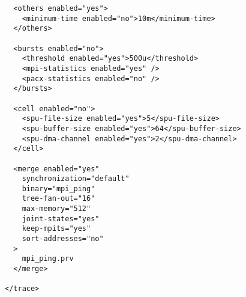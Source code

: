 \begin{verbatim}
  <others enabled="yes">
    <minimum-time enabled="no">10m</minimum-time>
  </others>

  <bursts enabled="no">
    <threshold enabled="yes">500u</threshold>
    <mpi-statistics enabled="yes" />
    <pacx-statistics enabled="no" />
  </bursts>

  <cell enabled="no">
    <spu-file-size enabled="yes">5</spu-file-size>
    <spu-buffer-size enabled="yes">64</spu-buffer-size>
    <spu-dma-channel enabled="yes">2</spu-dma-channel>
  </cell>

  <merge enabled="yes" 
    synchronization="default"
    binary="mpi_ping"
    tree-fan-out="16"
    max-memory="512"
    joint-states="yes"
    keep-mpits="yes"
    sort-addresses="no"
  >
    mpi_ping.prv 
  </merge>

</trace>
\end{verbatim}

